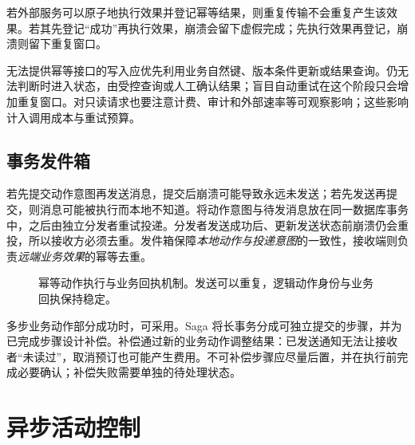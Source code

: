 \documentclass[../textbook.tex]{subfiles}
\begin{document}
若外部服务可以原子地执行效果并登记幂等结果，则重复传输不会重复产生该效果。若其先登记“成功”再执行效果，崩溃会留下虚假完成；先执行效果再登记，崩溃则留下重复窗口。


无法提供幂等接口的写入应优先利用业务自然键、版本条件更新或结果查询。仍无法判断时进入状态，由受控查询或人工确认结果；盲目自动重试在这个阶段只会增加重复窗口。对只读请求也要注意计费、审计和外部速率等可观察影响；这些影响计入调用成本与重试预算。

\subsection{事务发件箱}
若先提交动作意图再发送消息，提交后崩溃可能导致永远未发送；若先发送再提交，则消息可能被执行而本地不知道。将动作意图与待发消息放在同一数据库事务中，之后由独立分发者重试投递\cite{awsOutbox}。分发者发送成功后、更新发送状态前崩溃仍会重投，所以接收方必须去重。发件箱保障\emph{本地动作与投递意图}的一致性，接收端则负责\emph{远端业务效果}的幂等去重。

\begin{figure}[htbp]
\centering
{}
\caption[幂等动作执行与业务回执机制]{幂等动作执行与业务回执机制。发送可以重复，逻辑动作身份与业务回执保持稳定。}
\end{figure}

多步业务动作部分成功时，可采用。Saga 将长事务分成可独立提交的步骤，并为已完成步骤设计补偿\cite{garciamolina1987sagas}。补偿通过新的业务动作调整结果：已发送通知无法让接收者“未读过”，取消预订也可能产生费用。不可补偿步骤应尽量后置，并在执行前完成必要确认；补偿失败需要单独的待处理状态。

\section{异步活动控制}
\end{document}
